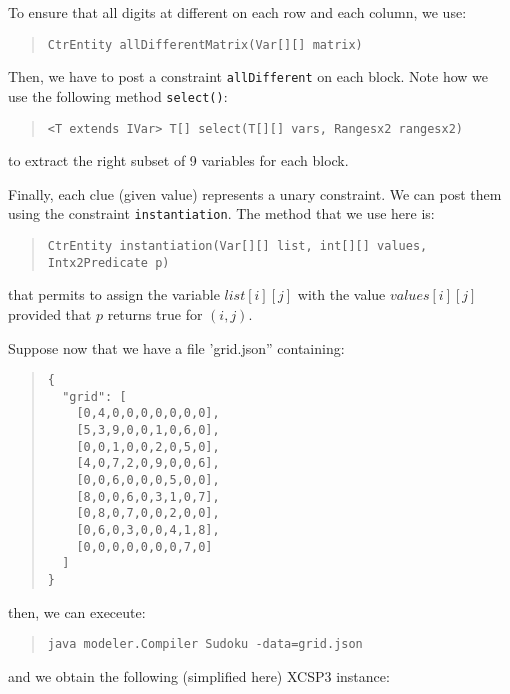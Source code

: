 \documentclass[10pt]{article}
\def\xt{{\rm XCSP3}\xspace}
\newcommand{\gb}[1]{{\tt #1}} %
\newcommand{\nn}[1]{{\tt #1}} %
\def\xt{{\rm XCSP3}\xspace}
\begin{document}
To ensure that all digits at different on each row and each column, we use:

\begin{quote}
\begin{verbatim}
CtrEntity allDifferentMatrix(Var[][] matrix) 
\end{verbatim}
\end{quote}

Then, we have to post a constraint \gb{allDifferent} on each block.
Note how we use the following method \nn{select()}:

\begin{quote}
\begin{verbatim}
<T extends IVar> T[] select(T[][] vars, Rangesx2 rangesx2) 
\end{verbatim}
\end{quote}

to extract the right subset of 9 variables for each block.

Finally, each clue (given value) represents a unary constraint.
We can post them using the constraint \gb{instantiation}.
The method that we use here is:

\begin{quote}
\begin{verbatim}
CtrEntity instantiation(Var[][] list, int[][] values, Intx2Predicate p) 
\end{verbatim}
\end{quote}
that permits to assign the variable $list[i][j]$ with the value $values[i][j]$ provided that $p$ returns true for $(i,j)$. 


Suppose now that we have a file 'grid.json'' containing:
\begin{quote}
\begin{verbatim}
{
  "grid": [
    [0,4,0,0,0,0,0,0,0],
    [5,3,9,0,0,1,0,6,0],
    [0,0,1,0,0,2,0,5,0],
    [4,0,7,2,0,9,0,0,6],
    [0,0,6,0,0,0,5,0,0],
    [8,0,0,6,0,3,1,0,7],
    [0,8,0,7,0,0,2,0,0],
    [0,6,0,3,0,0,4,1,8],
    [0,0,0,0,0,0,0,7,0]
  ]
}
\end{verbatim}
\end{quote}

then, we can execeute:
\begin{quote}
\begin{verbatim}
java modeler.Compiler Sudoku -data=grid.json
\end{verbatim}
\end{quote}
and we obtain the following (simplified here) \xt instance:
\end{document}
